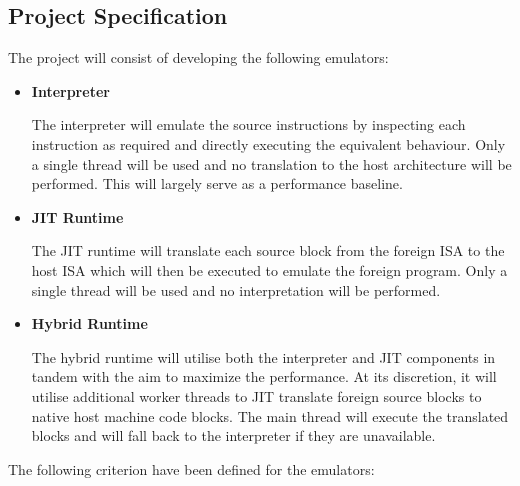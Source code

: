 \subsection{Project Specification}

The project will consist of developing the following emulators:

\begin{itemize}
    \item \textbf{Interpreter}
    
    The interpreter will emulate the source instructions by inspecting each instruction as required and directly executing the equivalent behaviour. Only a single thread will be used and no translation to the host architecture will be performed. This will largely serve as a performance baseline.
    
    \item \textbf{JIT Runtime}
    
    The JIT runtime will translate each source block from the foreign ISA to the host ISA which will then be executed to emulate the foreign program. Only a single thread will be used and no interpretation will be performed.
    
    \item \textbf{Hybrid Runtime}
    
    The hybrid runtime will utilise both the interpreter and JIT components in tandem with the aim to maximize the performance. At its discretion, it will utilise additional worker threads to JIT translate foreign source blocks to native host machine code blocks. The main thread will execute the translated blocks and will fall back to the interpreter if they are unavailable.
\end{itemize}

The following criterion have been defined for the emulators:

